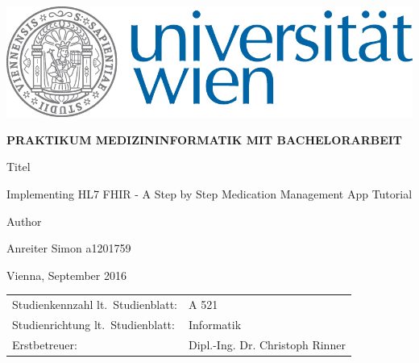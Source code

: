 \begin{titlepage}
\vspace*{-2cm}  %
\begin{flushright}
    \includegraphics{UNI-Logo_RGB_01}
\end{flushright}
\vspace{1cm}

\begin{center}  %
    \Large{\textbf{\textsf{\MakeUppercase{
        Praktikum Medizininformatik mit Bachelorarbeit
    }}}}
    \vspace{2cm}

    \large{\textsf{
        Titel
    }}
    \vspace{.1cm}

    \Large{\textsf{
        Implementing HL7 FHIR - A Step by Step Medication Management App Tutorial
    }}
    \vspace{3cm}

    \large{\textsf{
        Author
    }}

    \Large{\textsf{
        Anreiter Simon a1201759
    }}
    \vspace{3cm}

\end{center}
\vspace{2cm}

\noindent\textsf{Vienna, September 2016}  %
\vfill

\noindent\begin{tabular}{@{}ll}
\textsf{Studienkennzahl lt.\ Studienblatt:}
&
\textsf{A 521}  %
\\
\textsf{Studienrichtung lt.\ Studienblatt:}
&
\textsf{Informatik}  %
\\
\textsf{Erstbetreuer:}
&
\textsf{Dipl.-Ing. Dr. Christoph Rinner}  %

\end{tabular}

\end{titlepage}
